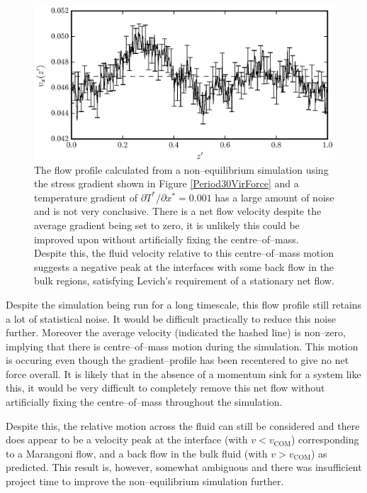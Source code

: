 \begin{figure}[h]
\centering
\includegraphics[scale=0.8]{Period30VirFlow}
\caption{The flow profile calculated from a non--equilibrium simulation using the stress gradient shown in Figure \ref{Period30VirForce} and a temperature gradient of $\partial T^{*} / \partial x^{*} = 0.001$ has a large amount of noise and is not very conclusive.
There is a net flow velocity despite the average gradient being set to zero, it is unlikely this could be improved upon without artificially fixing the centre--of--mass.
Despite this, the fluid velocity relative to this centre--of--mass motion suggests a negative peak at the interfaces with some back flow in the bulk regions, satisfying Levich's requirement of a stationary net flow.\cite{Levich}
 }
\label{Period30VirFlow}
\end{figure}

Despite the simulation being run for a long timescale, this flow profile still retains a lot of statistical noise.
It would be difficult practically to reduce this noise further.
Moreover the average velocity (indicated the hashed line) is non--zero, implying that there is centre--of--mass motion during the simulation.
This motion is occuring even though the gradient--profile has been recentered to give no net force overall.
It is likely that in the absence of a momentum sink for a system like this, it would be very difficult to completely remove this net flow without artificially fixing the centre--of--mass throughout the simulation.

Despite this, the relative motion across the fluid can still be considered and there does appear to be a velocity peak at the interface (with $v < v_{\mathrm{COM}}$) corresponding to a Marangoni flow, and a back flow in the bulk fluid (with $v > v_{\mathrm{COM}}$) as predicted.
This result is, however, somewhat ambiguous and there was insufficient project time to improve the non--equilibrium simulation further.

